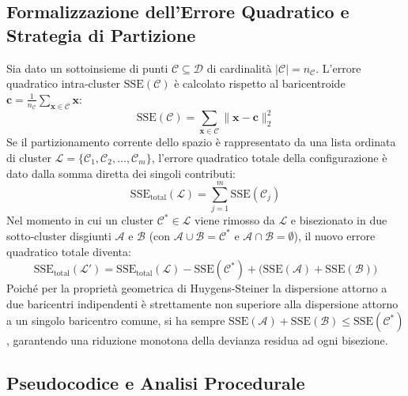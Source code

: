 \subsection{Formalizzazione dell'Errore Quadratico e Strategia di Partizione}

Sia dato un sottoinsieme di punti $\mathcal{C} \subseteq \mathcal{D}$ di cardinalità $|\mathcal{C}| = n_{\mathcal{C}}$. L'errore quadratico intra-cluster $\mathrm{SSE}(\mathcal{C})$ è calcolato rispetto al baricentroide $\mathbf{c} = \frac{1}{n_{\mathcal{C}}} \sum_{\mathbf{x} \in \mathcal{C}} \mathbf{x}$:
\begin{equation}
\label{eq:dm-sse-single-cluster}
\mathrm{SSE}(\mathcal{C}) = \sum_{\mathbf{x} \in \mathcal{C}} \|\mathbf{x} - \mathbf{c}\|_2^2
\end{equation}
Se il partizionamento corrente dello spazio è rappresentato da una lista ordinata di cluster $\mathcal{L} = \{\mathcal{C}_1, \mathcal{C}_2, \dots, \mathcal{C}_m\}$, l'errore quadratico totale della configurazione è dato dalla somma diretta dei singoli contributi:
\begin{equation}
\label{eq:dm-sse-total-list}
\mathrm{SSE}_{\text{total}}(\mathcal{L}) = \sum_{j=1}^m \mathrm{SSE}(\mathcal{C}_j)
\end{equation}
Nel momento in cui un cluster $\mathcal{C}^* \in \mathcal{L}$ viene rimosso da $\mathcal{L}$ e bisezionato in due sotto-cluster disgiunti $\mathcal{A}$ e $\mathcal{B}$ (con $\mathcal{A} \cup \mathcal{B} = \mathcal{C}^*$ e $\mathcal{A} \cap \mathcal{B} = \emptyset$), il nuovo errore quadratico totale diventa:
\begin{equation}
\label{eq:dm-sse-split-delta}
\mathrm{SSE}_{\text{total}}(\mathcal{L}') = \mathrm{SSE}_{\text{total}}(\mathcal{L}) - \mathrm{SSE}(\mathcal{C}^*) + \big( \mathrm{SSE}(\mathcal{A}) + \mathrm{SSE}(\mathcal{B}) \big)
\end{equation}
Poiché per la proprietà geometrica di Huygens-Steiner la dispersione attorno a due baricentri indipendenti è strettamente non superiore alla dispersione attorno a un singolo baricentro comune, si ha sempre $\mathrm{SSE}(\mathcal{A}) + \mathrm{SSE}(\mathcal{B}) \le \mathrm{SSE}(\mathcal{C}^*)$, garantendo una riduzione monotona della devianza residua ad ogni bisezione.

\subsection{Pseudocodice e Analisi Procedurale}

